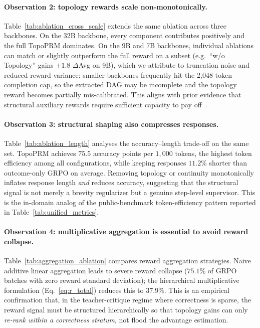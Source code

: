     
    
    
    \paragraph{Observation 2: topology rewards scale non-monotonically.}
    Table~\ref{tab:ablation_cross_scale} extends the same ablation across three backbones. On the 32B backbone, every component contributes positively and the full TopoPRM dominates. On the 9B and 7B backbones, individual ablations can match or slightly outperform the full reward on a subset (e.g.\ ``w/o Topology'' gains $+1.8$ $\Delta$Avg on 9B), which we attribute to truncation noise and reduced reward variance: smaller backbones frequently hit the 2{,}048-token completion cap, so the extracted DAG may be incomplete and the topology reward becomes partially mis-calibrated. This aligns with prior evidence that structural auxiliary rewards require sufficient capacity to pay off~\citep{liu2026graph,yu2025dapo}.
    
    
    
    \paragraph{Observation 3: structural shaping also compresses responses.}
    Table~\ref{tab:ablation_length} analyses the accuracy--length trade-off on the same set. TopoPRM achieves $75.5$ accuracy points per $1{,}000$ tokens, the highest token efficiency among all configurations, while keeping responses $11.2\%$ shorter than outcome-only GRPO on average. Removing topology or continuity monotonically inflates response length \emph{and} reduces accuracy, suggesting that the structural signal is not merely a brevity regularizer but a genuine step-level supervisor. This is the in-domain analog of the public-benchmark token-efficiency pattern reported in Table~\ref{tab:unified_metrics}.
    
    
    
    \paragraph{Observation 4: multiplicative aggregation is essential to avoid reward collapse.}
    Table~\ref{tab:aggregation_ablation} compares reward aggregation strategies. Naive additive linear aggregation leads to severe reward collapse ($75.1\%$ of GRPO batches with zero reward standard deviation); the hierarchical multiplicative formulation (Eq.~\ref{eq:r_total}) reduces this to $37.9\%$. This is an empirical confirmation that, in the teacher-critique regime where correctness is sparse, the reward signal must be structured hierarchically so that topology gains can only \emph{re-rank within a correctness stratum}, not flood the advantage estimation.
    
